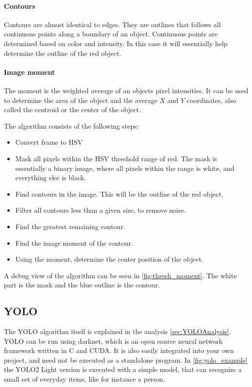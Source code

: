 \paragraph{Contours}
Contours are almost identical to edges.
They are outlines that follows all continuous points along a boundary of an object.
Continuous points are determined based on color and intensity.
In this case it will essentially help determine the outline of the red object\cite{contours}.

\paragraph{Image moment}
The moment is the weighted average of an objects pixel intensities.
It can be used to determine the area of the object and the average $X$ and $Y$ coordinates, also called the centroid or the center of the object.


The algorithm consists of the following steps:
\begin{itemize}
	\item Convert frame to HSV
	\item Mask all pixels within the HSV threshold range of red.
	The mask is essentially a binary image, where all pixels within the range is white, and everything else is black.
	\item Find contours in the image. 
	This will be the outline of the red object.
	\item Filter all contours less than a given size, to remove noise.
	\item Find the greatest remaining contour.
	\item Find the image moment of the contour.
	\item Using the moment, determine the center position of the object.
\end{itemize}

A debug view of the algorithm can be seen in \autoref{fig:thresh_moment}.
The white part is the mask and the blue outline is the contour.


\subsection{YOLO}

The YOLO algorithm itself is explained in the analysis \autoref{sec:YOLOAnalysis}.
YOLO can be run using darknet, which is an open source neural network framework written in C and CUDA\cite{darknet13}.
It is also easily integrated into your own project, and need not be executed as a standalone program.
In \autoref{fig:yolo_example} the YOLO2 Light version is executed with a simple model, that can recognize a small set of everyday items, like for instance a person.

